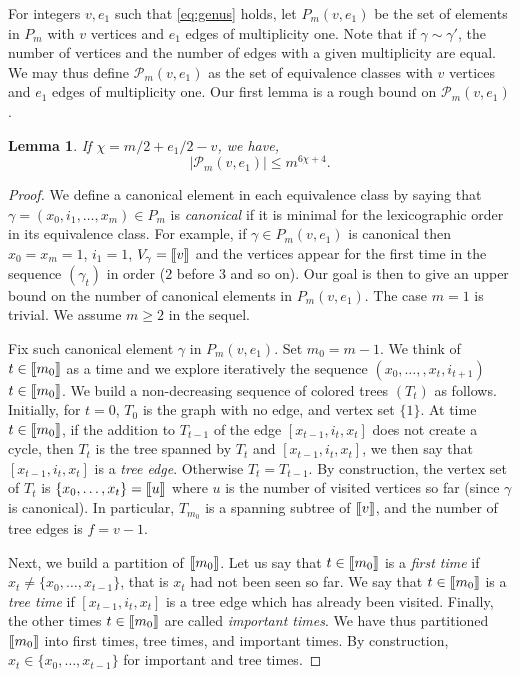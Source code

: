 \documentclass[11pt]{article}
\newtheorem{lemma}{Lemma}[section]
\newcommand{\cP}{\mathcal {P}}
\newcommand{\1}{1\!\!{\sf I}}
\newcommand{\INT}[1]{{{\left[\hspace{-1.4pt}\left[#1\right]\hspace{-1.4pt}\right]}}}
\begin{document}
For integers $v, e_1$ such that \eqref{eq:genus} holds,  let $P_{m} (v,e_1)$ be the set of elements in $P_{m}$  with $v$ vertices and $e_1$ edges of multiplicity one.  Note that if $\gamma \sim \gamma'$, the number of vertices and the number of 
edges with a given multiplicity are equal. We may thus define $\cP_{m} (v,e_1)$ as the set of equivalence classes 
with $v$ vertices and $e_1$ edges of multiplicity one.  Our first lemma is a rough bound on $\cP_{m} (v,e_1)$. 

\begin{lemma}\label{le:Plclass}
If $\chi  = m/2 + e_1/2 - v $, we have, 
$$
|\cP_{m} (v,e_1) |\leq m  ^{ 6 \chi +4 }.  
$$
\end{lemma}
\begin{proof}
We define a canonical element 
in each equivalence class  by saying that $\gamma = (x_0,i_1,\ldots,x_m) \in P_{m}$ is {\em canonical} if it is minimal 
for the lexicographic order in its equivalence class. For example, if $\gamma \in P_{m}(v, e_1)$ is canonical then 
$x_0 = x_m = 1$, $i_1 = 1$, $V_\gamma = \INT{v}$ and the vertices appear for the first time in the sequence $(\gamma_t)$ in order ($2$ before $3$ and so on).  
Our goal is then to give an upper bound on the number of canonical elements in $P_{m} (v,e_1)$. The case $m=1$ is trivial. We assume $m \geq 2$ in the sequel.


Fix such canonical element $\gamma$ in $P_{m} (v,e_1)$. Set $m_0 = m-1$. We think of $t \in \INT{m_0}$ as a time and we explore iteratively the sequence  $(x_{0},\ldots, ,x_t,i_{t+1})$ $t \in \INT{m_0}$. We build a non-decreasing sequence of colored trees $(T_t)$ as follows. Initially, for $t=0$, $T_0$ is the graph with no edge, and vertex set $\{1 \}$. At time $t \in \INT{m_0}$, if the addition to $T_{t-1}$ of the edge 
$[x_{t-1},i_t,x_{t}]$ does not create a cycle, then $T_t$ is the tree spanned by $T_t$ and $[x_{t-1},i_t,x_{t}]$, we then say that 
$[x_{t-1},i_t,x_{t}]$ is a {\em tree edge}. Otherwise $T_t = T_{t-1}$. By construction, the vertex set of $T_t$ is $ \{x_0,\ldots,x_t\} = \INT{u}$ where $u$ is the number of visited vertices so far (since $\gamma$ is canonical). In particular, $T_{m_0}$ is a spanning subtree of $\INT{v}$, and the number of tree edges is $f = v-1$. 

Next, we build a partition of $\INT{m_0}$. Let us say that $t \in \INT{m_0}$ is a {\em first time} if
$x_{t} \ne \{x_0,\ldots,x_{t-1}\}$, that is $x_t$ had not been seen so far. 
We say that 
$t \in \INT{m_0}$ is a {\em tree time} if  $[x_{t-1},i_t,x_{t}]$ is a tree edge which has already been visited. Finally, the other times $t \in \INT{m_0}$ are 
called {\em important times}. We have thus partitioned $\INT{m_0}$ into first times, tree times, and important times. By construction, $x_t \in \{x_0,\ldots,x_{t-1}\}$ for important and tree times.



\end{proof}
\end{document}
